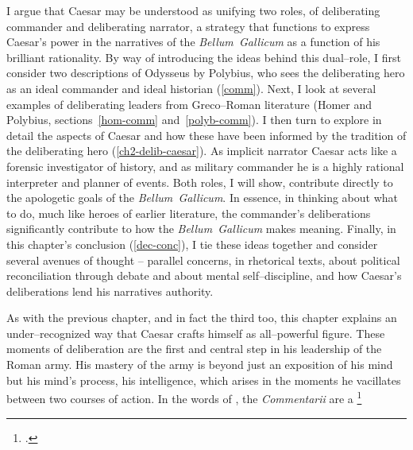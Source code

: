 \documentclass[12pt,letterpaper,oneside,final]{memoir}
\begin{document}
I argue that Caesar may be understood as unifying two roles, of deliberating commander and deliberating narrator, a strategy that functions to express Caesar's power in the narratives of the \emph{Bellum~Gallicum} as a function of his brilliant rationality. By way of introducing the ideas behind this dual--role, I first consider two descriptions of Odysseus by Polybius, who sees the deliberating hero as an ideal commander and ideal historian (\ref{comm}). Next, I look at several examples of deliberating leaders from Greco--Roman literature (Homer and Polybius, sections~\ref{hom-comm} and~\ref{polyb-comm}). I then turn to explore in detail the  aspects of Caesar and how these have been informed by the tradition of the deliberating hero (\ref{ch2-delib-caesar}). As implicit narrator Caesar acts like a forensic investigator of history, and as military commander he is a highly rational interpreter and planner of events. Both roles, I will show, contribute directly to the apologetic goals of the \emph{Bellum~Gallicum}. In essence, in thinking about what to do, much like heroes of earlier literature, the commander's deliberations significantly contribute to how the \emph{Bellum~Gallicum} makes meaning. Finally, in this chapter's conclusion (\ref{dec-conc}), I tie these ideas together and consider several avenues of thought -- parallel concerns, in rhetorical texts, about political reconciliation through debate and about mental self--discipline, and how Caesar's deliberations lend his narratives authority.

As with the previous chapter, and in fact the third too, this chapter explains an under--recognized way that Caesar crafts himself as all--powerful figure. These moments of deliberation are the first and central step in his leadership of the Roman army. His mastery of the army is beyond just an exposition of his mind but his mind's process, his intelligence, which arises in the moments he vacillates between two courses of action. In the words of \textcite{rambaud1966}, the \emph{Commentarii} are a \footnote{.}
\end{document}
